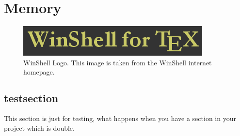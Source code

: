\chapter{Memory}
\label{chap3}
\thispagestyle{empty}

\begin{figure}
 \centering\includegraphics[]{winshell}
 \caption[WinShell Logo]{ 
 WinShell Logo.
 This image is taken from the WinShell internet homepage.
 } \label{pic_winshell}
\end{figure}


\section{testsection}

This section is just for testing, what happens when you have
a section in your project which is double.


       
